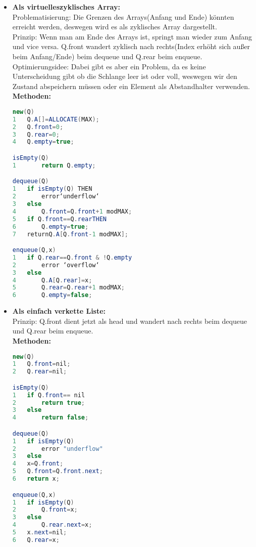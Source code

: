 \documentclass[jou,apacite]{apa6}
\begin{document}
\begin{itemize}
\item {\bfseries Als \dq virtuelles\dq  zyklisches Array:} \\
Problematisierung: Die Grenzen des Arrays(Anfang und Ende) könnten erreicht werden, 
deswegen wird es als zyklisches Array dargestellt. \\
Prinzip: Wenn man am Ende des Arrays ist, springt man wieder zum Anfang und vice versa. Q.front wandert zyklisch nach rechts(Index erhöht sich außer beim Anfang/Ende) beim dequeue und Q.rear beim enqueue. \\
Optimierungsidee: Dabei gibt es aber ein Problem, da es keine Unterscheidung gibt ob die Schlange leer ist oder voll, weswegen wir den Zustand abspeichern müssen oder ein Element als Abstandhalter verwenden. \\
{\bfseries Methoden:} 
\begin{lstlisting}[language=java]
new(Q)
1   Q.A[]=ALLOCATE(MAX);
2   Q.front=0;
3   Q.rear=0;
4   Q.empty=true;

isEmpty(Q)
1       return Q.empty;

dequeue(Q)
1   if isEmpty(Q) THEN
2       error‘underflow‘
3   else 
4       Q.front=Q.front+1 modMAX;
5   if Q.front==Q.rearTHEN
6       Q.empty=true;
7   returnQ.A[Q.front-1 modMAX];

enqueue(Q,x)
1   if Q.rear==Q.front & !Q.empty
2       error ‘overflow‘
3   else 
4       Q.A[Q.rear]=x;
5       Q.rear=Q.rear+1 modMAX;
6       Q.empty=false;
\end{lstlisting}
\item {\bfseries Als einfach verkette Liste:}\\
Prinzip: Q.front dient jetzt als head und wandert nach rechts beim dequeue und Q.rear beim enqueue. \\
{\bfseries Methoden:} 
\begin{lstlisting}[language=java]
new(Q)
1   Q.front=nil;
2   Q.rear=nil;

isEmpty(Q)
1   if Q.front== nil
2       return true;
3   else 
4       return false;

dequeue(Q)
1   if isEmpty(Q) 
2       error "underflow"
3   else
4   x=Q.front;
5   Q.front=Q.front.next;
6   return x;

enqueue(Q,x)
1   if isEmpty(Q) 
2       Q.front=x;
3   else
4       Q.rear.next=x; 
5   x.next=nil;
6   Q.rear=x;
\end{lstlisting}
\end{itemize}
\end{document}
